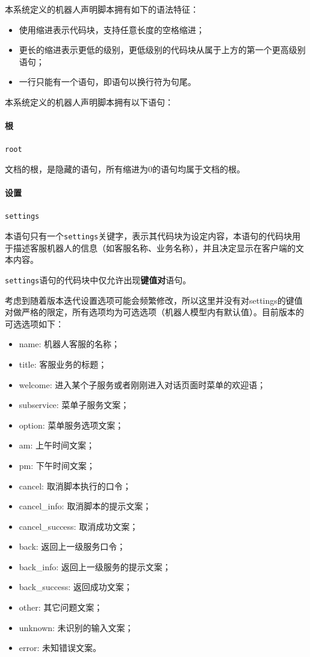 \documentclass[hyperref]{ctexart}
\begin{document}
本系统定义的机器人声明脚本拥有如下的语法特征：
\begin{itemize}
    \item 使用缩进表示代码块，支持任意长度的空格缩进；
    \item 更长的缩进表示更低的级别，更低级别的代码块从属于上方的第一个更高级别语句；
    \item 一行只能有一个语句，即语句以换行符为句尾。
\end{itemize}
本系统定义的机器人声明脚本拥有以下语句：
\paragraph{根}
\texttt{root}
\par 文档的根，是隐藏的语句，所有缩进为0的语句均属于文档的根。
\paragraph{设置}
\texttt{settings}
\par 本语句只有一个\texttt{settings}关键字，表示其代码块为设定内容，本语句的代码块用于描述客服机器人的信息（如客服名称、业务名称），并且决定显示在客户端的文本内容。
\par \texttt{settings}语句的代码块中仅允许出现{\bf 键值对}语句。
\par 考虑到随着版本迭代设置选项可能会频繁修改，所以这里并没有对settings的键值对做严格的限定，所有选项均为可选选项（机器人模型内有默认值）。目前版本的可选选项如下：
\begin{itemize}
    \item name: 机器人客服的名称；
    \item title: 客服业务的标题；
    \item welcome: 进入某个子服务或者刚刚进入对话页面时菜单的欢迎语；
    \item subservice: 菜单子服务文案；
    \item option: 菜单服务选项文案；
    \item am: 上午时间文案；
    \item pm: 下午时间文案；
    \item cancel: 取消脚本执行的口令；
    \item cancel\_info: 取消脚本的提示文案；
    \item cancel\_success: 取消成功文案；
    \item back: 返回上一级服务口令；
    \item back\_info: 返回上一级服务的提示文案；
    \item back\_success: 返回成功文案；
    \item other: 其它问题文案；
    \item unknown: 未识别的输入文案；
    \item error: 未知错误文案。
\end{itemize}
\end{document}
